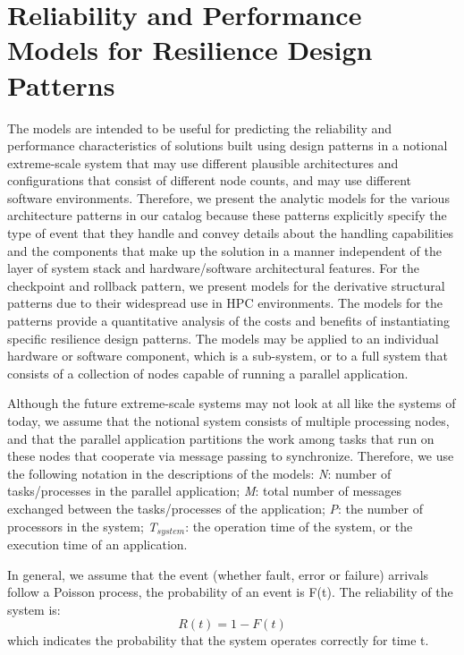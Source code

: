 \section{Reliability and Performance Models for Resilience Design Patterns}
\label{sec:Models}

The models are intended to be useful for predicting the reliability and performance characteristics of solutions built using design patterns in a notional extreme-scale system that may use different plausible architectures and configurations that consist of different node counts, and may use different software environments.  
Therefore, we present the analytic models for the various architecture patterns in our catalog because these patterns explicitly specify the type of event that they handle and convey details about the handling capabilities and the components that make up the solution in a manner independent of the layer of system stack and hardware/software architectural features. For the checkpoint and rollback pattern, we present models for the derivative structural patterns due to their widespread use in HPC environments. The models for the patterns provide a quantitative analysis of the costs and benefits of instantiating specific resilience design patterns. The models may be applied to an individual hardware or software component, which is a sub-system, or to a full system that consists of a collection of nodes capable of running a parallel application. 

Although the future extreme-scale systems may not look at all like the systems of today, we assume that the notional system consists of multiple processing nodes, and that the parallel application partitions the work among tasks that run on these nodes that cooperate via message passing to synchronize. Therefore, we use the following notation in the descriptions of the models: \textit{N}: number of tasks/processes in the parallel application; \textit{M}: total number of messages exchanged between the tasks/processes of the application; \textit{P}: the number of processors in the system; \textit{T$_{system}$}: the operation time of the system, or the execution time of an application.  

In general, we assume that the event (whether fault, error or failure) arrivals follow a Poisson process, the probability of an event is F(t). The reliability of the system is:
\begin{equation}
R(t) = 1 - F(t) 
\label{eq:reliability1}
\end{equation}
which indicates the probability that the system operates correctly for time t.

